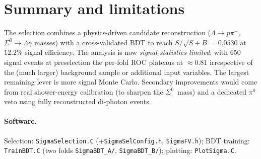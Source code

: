 \documentclass[11pt,a4paper]{article}
\newcommand{\Szero}{\ensuremath{\Sigma^0}}
\newcommand{\Lam}{\ensuremath{\Lambda}}
\newcommand{\FoM}{\ensuremath{S/\sqrt{S+B}}}
\begin{document}
\section{Summary and limitations}
The selection combines a physics-driven candidate reconstruction
($\Lam\!\to\!p\pi^-$, $\Szero\!\to\!\Lam\gamma$ masses) with a cross-validated
BDT to reach $\FoM=0.0530$ at $12.2\%$ signal efficiency. The analysis is now
\emph{signal-statistics limited}: with $650$ signal events at preselection the
per-fold ROC plateaus at $\approx 0.81$ irrespective of the (much larger)
background sample or additional input variables. The largest remaining lever is
more signal Monte Carlo. Secondary improvements would come from real
shower-energy calibration (to sharpen the \Szero\ mass) and a dedicated $\pi^0$
veto using fully reconstructed di-photon events.

\paragraph{Software.} Selection: \texttt{SigmaSelection.C} (+\texttt{SigmaSelConfig.h},
\texttt{SigmaFV.h}); BDT training: \texttt{TrainBDT.C} (two folds
\texttt{SigmaBDT\_A/}, \texttt{SigmaBDT\_B/}); plotting: \texttt{PlotSigma.C}.
\end{document}

